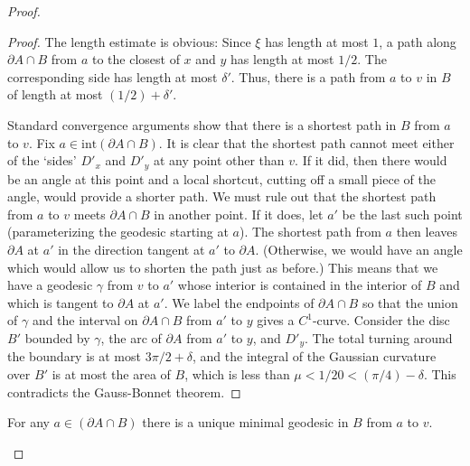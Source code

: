 \begin{proof}
\begin{proof}
The length estimate is obvious: Since $\xi$ has length at most $1$,
a path along $\partial A\cap B $ from $a$ to the closest of $x$ and
$y$ has length at most $1/2$. The corresponding side has length at
most $\delta'$. Thus, there is a path from $a$ to $v$ in $B$ of
length at most $(1/2)+\delta'$.


Standard convergence arguments show that there is a shortest path in
$B$ from $a$ to $v$. Fix $a\in \mathrm{int}(\partial A\cap B)$. It is
clear that the shortest path cannot meet either of the  `sides'
$D'_x$ and $D'_y$ at any point other than $v$. If it did, then there
would be an angle at this point and a local shortcut, cutting off a
small piece of the angle, would provide a shorter path. We must rule
out that the shortest path from $a$ to $v$ meets $\partial A\cap B$
in another point. If it does, let $a'$ be the last such point
(parameterizing the geodesic starting at $a$). The shortest path
from $a$ then leaves $\partial A$ at $a'$ in the direction tangent
at $a'$ to $\partial A$. (Otherwise, we would have an angle which
would allow us to shorten the path just as before.) This means that
we have a geodesic $\gamma$ from $v$ to $a'$ whose interior is
contained in the interior of $B$ and which is tangent to $\partial
A$ at $a'$. We label the endpoints of $\partial A\cap B$ so that the
union of $\gamma$ and the interval on $\partial A\cap B$ from $a'$
to $y$ gives a $C^1$-curve. Consider the disc $B'$ bounded
 by $\gamma$, the arc of $\partial A$ from $a'$
to $y$, and $D'_y$. The total turning around the boundary is at most
$3\pi/2+\delta$, and the integral of the Gaussian curvature over
$B'$ is at most the area of $B$, which is less than
$\mu<1/20<(\pi/4)-\delta$. This contradicts the Gauss-Bonnet
theorem.
\end{proof}

\begin{claim}
\label{claim:focusing-triangle-vertex-geodesic-unique}
For any $a\in (\partial A\cap B)$ there is a unique minimal geodesic
in $B$ from $a$ to $v$.
\end{claim}



\end{proof}
